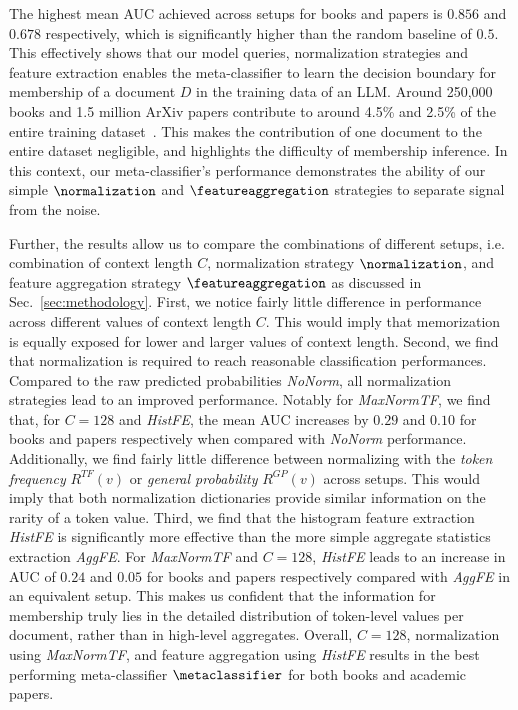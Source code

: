 \documentclass[twocolumn,10pt]{article}
\begin{document}
The highest mean AUC achieved across setups for books and papers is $0.856$ and $0.678$ respectively, which is significantly higher than the random baseline of $0.5$. This effectively shows that our model queries, normalization strategies and feature extraction enables the meta-classifier to learn the decision boundary for membership of a document $D$ in the training data of an LLM. Around 250,000 books and 1.5 million ArXiv papers  contribute to around 4.5\% and 2.5\% of the entire training dataset~\cite{touvron2023llama}. This makes the contribution of one document to the entire dataset negligible, and highlights the difficulty of membership inference. In this context, our meta-classifier's performance demonstrates the ability of our simple $\normalization$ and $\featureaggregation$ strategies to separate signal from the noise.

Further, the results allow us to compare the combinations of different setups, i.e. combination of context length $C$, normalization strategy $\normalization$, and feature aggregation strategy $\featureaggregation$ as discussed in Sec.~\ref{sec:methodology}. First, we notice fairly little difference in performance across different values of context length $C$. This would imply that memorization is equally exposed for lower and larger values of context length. Second, we find that normalization is required to reach reasonable classification performances. Compared to the raw predicted probabilities \textit{NoNorm}, all normalization strategies lead to an improved performance. Notably for \textit{MaxNormTF}, we find that, for $C=128$ and \textit{HistFE}, the mean AUC increases by $0.29$ and $0.10$ for books and papers respectively when compared with \textit{NoNorm} performance. Additionally, we find fairly little difference between normalizing with the \emph{token frequency} $R^{TF}(v)$ or \emph{general probability} $R^{GP}(v)$ across setups. This would imply that both normalization dictionaries provide similar information on the rarity of a token value. Third, we find that the histogram feature extraction \textit{HistFE} is significantly more effective than the more simple aggregate statistics extraction \textit{AggFE}. For \textit{MaxNormTF} and $C=128$, \textit{HistFE} leads to an increase in AUC of $0.24$ and $0.05$ for books and papers respectively compared with \textit{AggFE} in an equivalent setup. This makes us confident that the information for membership truly lies in the detailed distribution of token-level values per document, rather than in high-level aggregates. Overall, $C=128$, normalization using \textit{MaxNormTF}, and feature aggregation using \textit{HistFE} results in the best performing meta-classifier $\metaclassifier$ for both books and academic papers.
\end{document}
